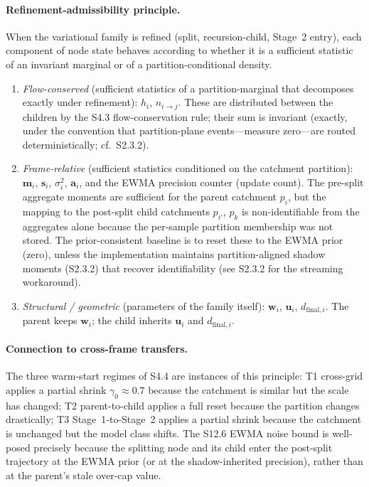 \documentclass[11pt]{article}
\begin{document}
\paragraph{Refinement-admissibility principle.}
When the variational family is refined (split, recursion-child, Stage~2 entry), each component of node state behaves according to whether it is a sufficient statistic of an invariant marginal or of a partition-conditional density.
\begin{enumerate}[leftmargin=1.5em]
  \item \emph{Flow-conserved} (sufficient statistics of a partition-marginal that decomposes exactly under refinement): $h_i$, $n_{i\to j}$. These are distributed between the children by the S4.3 flow-conservation rule; their sum is invariant (exactly, under the convention that partition-plane events---measure zero---are routed deterministically; cf.\ S2.3.2).
  \item \emph{Frame-relative} (sufficient statistics conditioned on the catchment partition): $\mathbf m_i$, $\mathbf s_i$, $\sigma_i^2$, $\mathbf a_i$, and the EWMA precision counter (update count). The pre-split aggregate moments are sufficient for the parent catchment $p_i$, but the mapping to the post-split child catchments $p_{i'}$, $p_k$ is non-identifiable from the aggregates alone because the per-sample partition membership was not stored. The prior-consistent baseline is to reset these to the EWMA prior (zero), unless the implementation maintains partition-aligned shadow moments (S2.3.2) that recover identifiability (see S2.3.2 for the streaming workaround).
  \item \emph{Structural / geometric} (parameters of the family itself): $\mathbf w_i$, $\mathbf u_i$, $d_{\mathrm{final},i}$. The parent keeps $\mathbf w_i$; the child inherits $\mathbf u_i$ and $d_{\mathrm{final},i}$.
\end{enumerate}

\paragraph{Connection to cross-frame transfers.}
The three warm-start regimes of S4.4 are instances of this principle: T1 cross-grid applies a partial shrink $\gamma_0\approx0.7$ because the catchment is similar but the scale has changed; T2 parent-to-child applies a full reset because the partition changes drastically; T3 Stage~1-to-Stage~2 applies a partial shrink because the catchment is unchanged but the model class shifts. The S12.6 EWMA noise bound is well-posed precisely because the splitting node and its child enter the post-split trajectory at the EWMA prior (or at the shadow-inherited precision), rather than at the parent's stale over-cap value.
\end{document}
